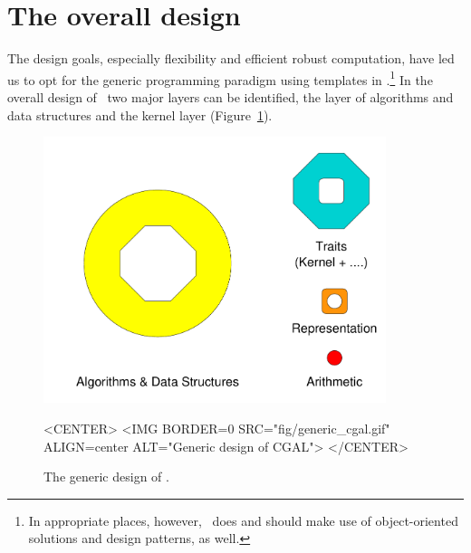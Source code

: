 
\section{The overall design}
\label{sec:overall_design}

The design goals, especially flexibility and efficient robust 
computation, have led us to opt for the generic programming paradigm using 
templates in \CC.\footnote{In appropriate places, however, \cgal\ does 
and should make use of object-oriented solutions and design patterns, as well.}
In the overall design of \cgal\ two major layers can be identified, the
layer of algorithms and data structures and the kernel layer
(Figure~\ref{fig:genericCGAL}).

\begin{figure}
\begin{ccTexOnly}
\begin{center}
  \includegraphics[width=10cm]{Developers_manual/fig/generic_cgal}
\end{center}
\end{ccTexOnly}
\caption{The generic design of \cgal.
\label{fig:genericCGAL}}

\begin{ccHtmlOnly}
<CENTER>
<IMG BORDER=0 SRC="fig/generic_cgal.gif" 
  ALIGN=center ALT="Generic design of CGAL">
</CENTER>
\end{ccHtmlOnly}
\end{figure}

